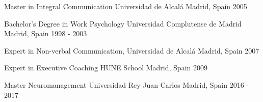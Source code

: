 

\begin{cventries}

  \cventry
    {Master in Integral Communication} %
    {Universidad de Alcalá} %
    {Madrid, Spain} %
    {2005} %
    {}

  \cventry
    {Bachelor's Degree in Work Psychology} %
    {Universidad Complutense de Madrid} %
    {Madrid, Spain} %
    {1998 - 2003} %
    {}

  \cventry
    {Expert in Non-verbal Communication,} %
    {Universidad de Alcalá} %
    {Madrid, Spain} %
    {2007} %
    {}

  \cventry
    {Expert in Executive Coaching} %
    {HUNE School} %
    {Madrid, Spain} %
    {2009} %
    {}

  \cventry
    {Master Neuromanagement} %
    {Universidad Rey Juan Carlos} %
    {Madrid, Spain} %
    {2016 - 2017} %
    {}

\end{cventries}
